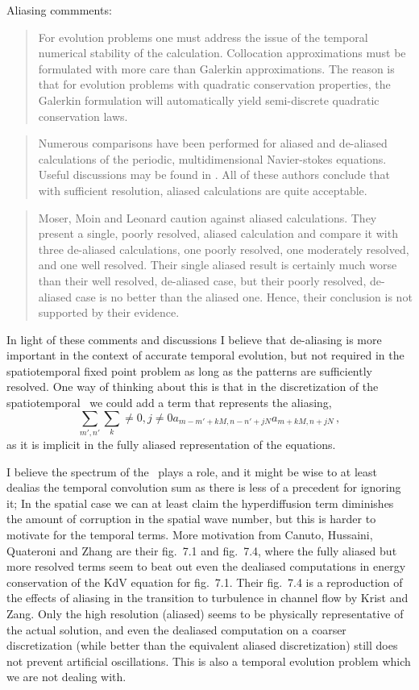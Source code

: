 \begin{itemize}
Aliasing commments:
\begin{quote}
For evolution problems  one must address the issue of the temporal numerical
stability of the calculation. Collocation approximations must be formulated
with more care than Galerkin approximations. The reason is that for evolution
problems with quadratic conservation properties, the Galerkin formulation
will automatically yield semi-discrete quadratic conservation laws.
\end{quote}

\begin{quote}
Numerous comparisons have been performed for aliased and de-aliased
calculations of the periodic, multidimensional Navier-stokes equations.
Useful discussions may be found in
.  All of these authors conclude
that with sufficient resolution, aliased calculations are quite acceptable.
\end{quote}


\begin{quote}
Moser, Moin and Leonard caution against aliased calculations.
They present a single, poorly resolved, aliased calculation and compare it with three
de-aliased calculations, one poorly resolved, one moderately resolved, and one well
resolved. Their single aliased result is certainly much worse than their well resolved,
de-aliased case, but their poorly resolved, de-aliased case is no better than the aliased
one. Hence, their conclusion is not supported by their evidence.
\end{quote}

In light of these comments and discussions I believe that de-aliasing is more
important in the context of accurate temporal evolution, but not required in
the spatiotemporal fixed point problem as long as the patterns are
sufficiently resolved. One way of thinking about this is that in the
discretization of the spatiotemporal \KSe\ we could add a term that
represents the aliasing,
\[
\sum_{m',n'}\sum_k\neq 0,j\neq 0 a_{m-m'+kM,n-n'+jN}a_{m+kM,n+jN}
\,,
\]
as it is implicit in the fully aliased representation of the equations.

I believe the spectrum of the \KSe\ plays a role, and it might be wise to at
least dealias the temporal convolution sum as there is less of a precedent
for ignoring it; In the spatial case we can at least claim the hyperdiffusion
term diminishes the amount of corruption in the spatial wave number, but this
is harder to motivate for the temporal terms.
More motivation from Canuto, Hussaini, Quateroni and Zhang are
their fig.~7.1 and fig.~7.4, where the fully aliased but more resolved terms seem
to beat out even the dealiased computations in energy conservation of the KdV
equation for fig.~7.1.
Their fig.~7.4 is a reproduction of the effects of aliasing in the transition
to turbulence in channel flow by  Krist and Zang. Only the high
resolution (aliased) seems to be physically representative of the actual
solution, and even the dealiased computation on a coarser discretization
(while better than the equivalent aliased discretization) still does not
prevent artificial oscillations. This is also a temporal evolution problem
which we are not dealing with.


\end{itemize}
